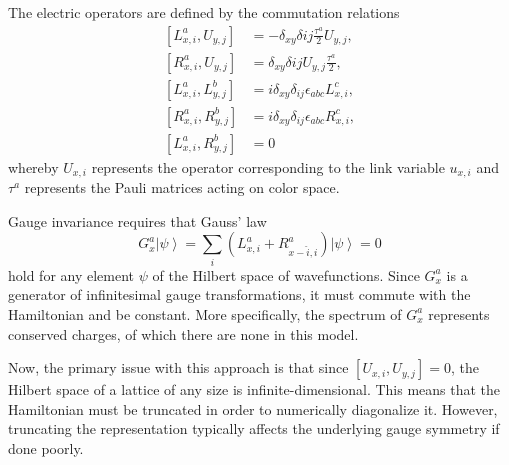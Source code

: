 \documentclass[a4paper,oneside, 11pt,english,listof=totoc,bibliography=totoc]{scrbook}
\begin{document}
The electric operators are defined by the commutation relations
\begin{equation}\label{eq:lr-commutation}
    \begin{array}{rl}
        \left[L^a_{x,i},U_{y,j}\right]&=-\delta_{xy}\delta{ij}\frac{\tau^a}{2}U_{y,j}, \\
        \left[R^a_{x,i},U_{y,j}\right]&=\delta_{xy}\delta{ij}U_{y,j}\frac{\tau^a}{2}, \\
        \left[L^a_{x,i},L^b_{y,j}\right]&=i\delta_{xy}\delta_{ij}\epsilon_{abc}L^c_{x,i}, \\
        \left[R^a_{x,i},R^b_{y,j}\right]&=i\delta_{xy}\delta_{ij}\epsilon_{abc}R^c_{x,i}, \\
        \left[L^a_{x,i},R^b_{y,j}\right]&=0
    \end{array}
\end{equation}
whereby $U_{x,i}$ represents the operator corresponding to the link variable $u_{x,i}$ and $\tau^a$ represents the Pauli matrices acting on color space.

Gauge invariance requires that Gauss' law
\begin{equation}\label{eq:gauss}
    G^a_x\left|\psi\right\rangle=\sum\limits_{i}\left(L^a_{x,i}+R^a_{x-\hat{i},i}\right)\left|\psi\right\rangle=0
\end{equation}
hold for any element $\psi$ of the Hilbert space of wavefunctions. Since $G^a_x$ is a generator of infinitesimal gauge transformations, it must commute with the Hamiltonian and be constant. More specifically, the spectrum of $G^a_x$ represents conserved charges, of which there are none in this model.

Now, the primary issue with this approach is that since $[U_{x,i}, U_{y,j}]=0$, the Hilbert space of a lattice of any size is infinite-dimensional. This means that the Hamiltonian must be truncated in order to numerically diagonalize it. However, truncating the representation typically affects the underlying gauge symmetry if done poorly.
\end{document}
